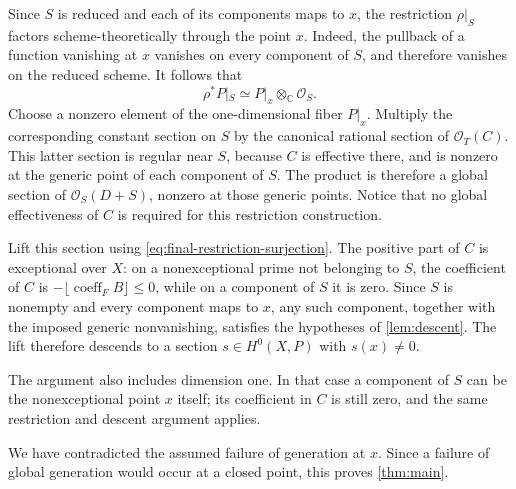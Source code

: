 Since $S$ is reduced and each of its components maps to $x$, the restriction $\rho|_S$ factors scheme-theoretically through the point $x$.  Indeed, the pullback of a function vanishing at $x$ vanishes on every component of $S$, and therefore vanishes on the reduced scheme.  It follows that
\[
 \rho^*P|_S\simeq P|_x\otimes_{\mathbb{C}}\mathcal{O}_S.
\]
Choose a nonzero element of the one-dimensional fiber $P|_x$. Multiply the corresponding constant section on $S$ by the canonical rational section of $\mathcal{O}_T(C)$.  This latter section is regular near $S$, because $C$ is effective there, and is nonzero at the generic point of each component of $S$.  The product is therefore a global section of $\mathcal{O}_S(D+S)$, nonzero at those generic points.  Notice that no global effectiveness of $C$ is required for this restriction construction.

Lift this section using \eqref{eq:final-restriction-surjection}. The positive part of $C$ is exceptional over $X$: on a nonexceptional prime not belonging to $S$, the coefficient of $C$ is $-\lfloor\operatorname{coeff}_F B\rfloor \leq0$, while on a component of $S$ it is zero. Since $S$ is nonempty and every component maps to $x$, any such component, together with the imposed generic nonvanishing, satisfies the hypotheses of \cref{lem:descent}. The lift therefore descends to a section $s\in H^0(X,P)$ with $s(x)\ne0$.

The argument also includes dimension one.  In that case a component of $S$ can be the nonexceptional point $x$ itself; its coefficient in $C$ is still zero, and the same restriction and descent argument applies.

We have contradicted the assumed failure of generation at $x$. Since a failure of global generation would occur at a closed point, this proves \cref{thm:main}.
